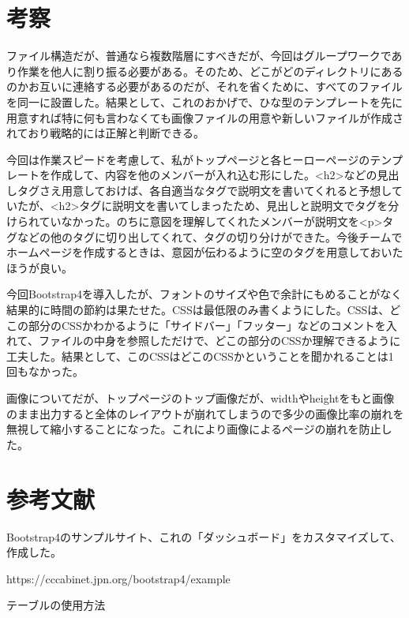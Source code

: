 \documentclass[12pt,a4j]{jarticle}
\begin{document}

\section{考察}

ファイル構造だが、普通なら複数階層にすべきだが、今回はグループワークであり作業を他人に割り振る必要がある。そのため、どこがどのディレクトリにあるのかお互いに連絡する必要があるのだが、それを省くために、すべてのファイルを同一に設置した。結果として、これのおかげで、ひな型のテンプレートを先に用意すれば特に何も言わなくても画像ファイルの用意や新しいファイルが作成されており戦略的には正解と判断できる。

今回は作業スピードを考慮して、私がトップページと各ヒーローページのテンプレートを作成して、内容を他のメンバーが入れ込む形にした。<h2>などの見出しタグさえ用意しておけば、各自適当なタグで説明文を書いてくれると予想していたが、<h2>タグに説明文を書いてしまったため、見出しと説明文でタグを分けられていなかった。のちに意図を理解してくれたメンバーが説明文を<p>タグなどの他のタグに切り出してくれて、タグの切り分けができた。今後チームでホームページを作成するときは、意図が伝わるように空のタグを用意しておいたほうが良い。

今回Bootstrap4を導入したが、フォントのサイズや色で余計にもめることがなく結果的に時間の節約は果たせた。CSSは最低限のみ書くようにした。CSSは、どこの部分のCSSかわかるように「サイドバー」「フッター」などのコメントを入れて、ファイルの中身を参照しただけで、どこの部分のCSSか理解できるように工夫した。結果として、このCSSはどこのCSSかということを聞かれることは1回もなかった。

画像についてだが、トップページのトップ画像だが、widthやheightをもと画像のまま出力すると全体のレイアウトが崩れてしまうので多少の画像比率の崩れを無視して縮小することになった。これにより画像によるページの崩れを防止した。

\section{参考文献}

Bootstrap4のサンプルサイト、これの「ダッシュボード」をカスタマイズして、作成した。

https://cccabinet.jpn.org/bootstrap4/example

テーブルの使用方法
\end{document}
